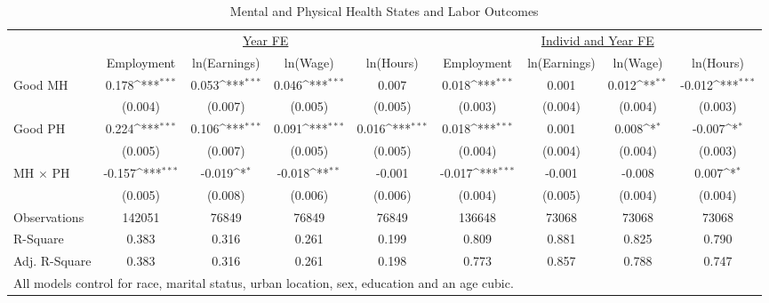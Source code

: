 \def\sym#1{\ifmmode^{#1}\else\(^{#1}\)\fi}
\begin{table}
\center\caption*{Mental and Physical Health States and Labor Outcomes}
\footnotesize
\begin{tabular}{l*{8}{c}}
                    &\multicolumn{4}{c}{\underline{Year FE}}                                                &\multicolumn{4}{c}{\underline{Individ and Year FE}}                                    \\\cmidrule(lr){2-5}\cmidrule(lr){6-9}
                    &\multicolumn{1}{c}{Employment}&\multicolumn{1}{c}{ln(Earnings)}&\multicolumn{1}{c}{ln(Wage)}&\multicolumn{1}{c}{ln(Hours)}&\multicolumn{1}{c}{Employment}&\multicolumn{1}{c}{ln(Earnings)}&\multicolumn{1}{c}{ln(Wage)}&\multicolumn{1}{c}{ln(Hours)}\\
\midrule
Good MH             &       0.178\sym{***}&       0.053\sym{***}&       0.046\sym{***}&       0.007         &       0.018\sym{***}&       0.001         &       0.012\sym{**} &      -0.012\sym{***}\\
                    &     (0.004)         &     (0.007)         &     (0.005)         &     (0.005)         &     (0.003)         &     (0.004)         &     (0.004)         &     (0.003)         \\
Good PH             &       0.224\sym{***}&       0.106\sym{***}&       0.091\sym{***}&       0.016\sym{***}&       0.018\sym{***}&       0.001         &       0.008\sym{*}  &      -0.007\sym{*}  \\
                    &     (0.005)         &     (0.007)         &     (0.005)         &     (0.005)         &     (0.004)         &     (0.004)         &     (0.004)         &     (0.003)         \\
MH $\times$ PH      &      -0.157\sym{***}&      -0.019\sym{*}  &      -0.018\sym{**} &      -0.001         &      -0.017\sym{***}&      -0.001         &      -0.008         &       0.007\sym{*}  \\
                    &     (0.005)         &     (0.008)         &     (0.006)         &     (0.006)         &     (0.004)         &     (0.005)         &     (0.004)         &     (0.004)         \\
\midrule
Observations        &      142051         &       76849         &       76849         &       76849         &      136648         &       73068         &       73068         &       73068         \\
R-Square            &       0.383         &       0.316         &       0.261         &       0.199         &       0.809         &       0.881         &       0.825         &       0.790         \\
Adj. R-Square       &       0.383         &       0.316         &       0.261         &       0.198         &       0.773         &       0.857         &       0.788         &       0.747         \\
\bottomrule
\multicolumn{9}{l}{\footnotesize{All models control for race, marital status, urban location, sex, education and an age cubic.}} \\
\end{tabular}
\end{table}
